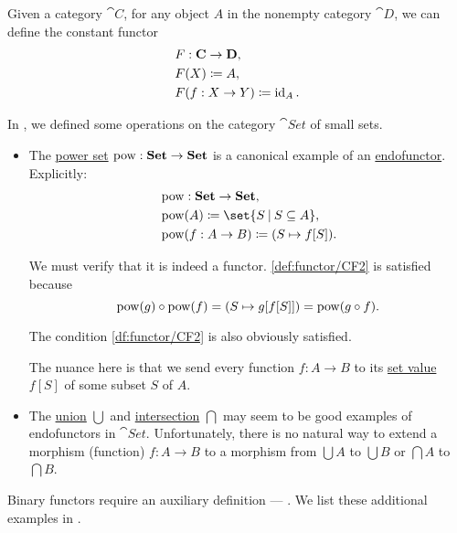 \begin{example}\label{ex:constant_functor}
  Given a category \( \cat{C} \), for any object \( A \) in the nonempty category \( \cat{D} \), we can define the constant functor
  \begin{equation*}
    \begin{aligned}
      &F: \operatorname{\mathbf{C}} \to \operatorname{\mathbf{D}}, \\
      &F(X) \coloneqq A, \\
      &F(f: X \to Y) \coloneqq \operatorname{id}_A.
    \end{aligned}
  \end{equation*}
\end{example}

\begin{example}\label{ex:functors_in_set/unary}
  In , we defined some operations on the category \hyperref[def:category_of_small_sets]{\( \cat{Set} \)} of small sets.

  \begin{itemize}
    \item The \hyperref[def:basic_set_operations/power_set]{power set} \( \operatorname{pow}: \operatorname{\mathbf{Set}} \to \operatorname{\mathbf{Set}} \) is a canonical example of an \hyperref[def:functor/endofunctor]{endofunctor}. Explicitly:
    \begin{equation*}
      \begin{aligned}
        &\pow: \cat{Set} \to \cat{Set}, \\
        &\pow(A) \coloneqq \set{ S \given S \subseteq A }, \\
        &\pow(f: A \to B) \coloneqq (S \mapsto f[S]). \\
      \end{aligned}
    \end{equation*}

    We must verify that it is indeed a functor. \ref{def:functor/CF2} is satisfied because
    \begin{equation*}
      \pow(g) \bincirc \pow(f) = (S \mapsto g[f[S]]) = \pow(g \bincirc f).
    \end{equation*}

    The condition \ref{df:functor/CF2} is also obviously satisfied.

    The nuance here is that we send every function \( f: A \to B \) to its \hyperref[def:multi_valued_function/set_value]{set value} \( f[S] \) of some subset \( S \) of \( A \).

    \item The \hyperref[def:basic_set_operations/union]{union} \( \bigcup \) and \hyperref[def:basic_set_operations/intersection]{intersection} \( \bigcap \) may seem to be good examples of endofunctors in \( \cat{Set} \). Unfortunately, there is no natural way to extend a morphism (function) \( f: A \to B \) to a morphism from \( \bigcup A \) to \( \bigcup B \) or \( \bigcap A \) to \( \bigcap B \).
  \end{itemize}

  Binary functors require an auxiliary definition --- . We list these additional examples in .
\end{example}


